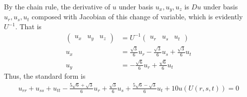 \documentclass[12pt]{article}
\begin{document}
\begin{problem}[1.4.3]
By the chain rule, the derivative of $ u$ under basis  $ u_x, u_y, u_z$ is $ Du$ under basis  $ u_r,u_s,u_t$ composed with Jacobian of this change of variable, which is evidently $ U^{-1}$. That is
\begin{align*}
	\begin{pmatrix} u_x &u_y&u_z \end{pmatrix} &= U^{-1} \begin{pmatrix} u_r&u_s&u_t \end{pmatrix}  \\
	u_x &= \frac{\sqrt{3} }{ 6} u_r  -\frac{\sqrt{3} }{ 6}  u_s  + \frac{\sqrt{3} }{ 6}  u_t \\
	u_y&= - \frac{\sqrt{6} }{ 6}u_r + \frac{\sqrt{6} }{ 6} u_t
\end{align*}
Thus, the standard form is
\begin{align*}
	u_{rr} + u_{ss} + u_{tt} - \frac{5 \sqrt{6}+ \sqrt{3}  }{6 }u_r + \frac{\sqrt{3} }{ 6}u_s + \frac{5\sqrt{6}-\sqrt{3}  } { 6}u_t +10 u\left( U (r,s,t) \right) =0
\end{align*}
\end{problem}
\end{document}
